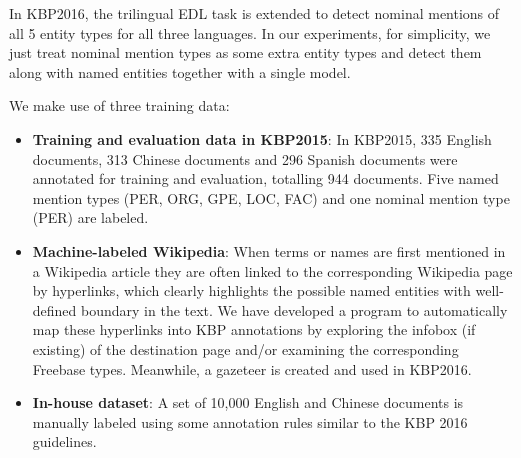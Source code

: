 \documentclass[11pt,a4paper]{article}
\begin{document}
In KBP2016, the trilingual EDL task is extended to detect nominal mentions of all 5 entity types for all three languages. In our experiments, for simplicity, we just treat nominal mention types as some extra entity types and detect them along with named entities together with a single model.  



We make use of three training data:

\begin{itemize}
	\item \textbf{Training and evaluation data in KBP2015}: In KBP2015, 335 English documents, 313 Chinese documents and 296 Spanish documents were annotated for training and evaluation, totalling 944 documents. Five named mention types (PER, ORG, GPE, LOC, FAC) and one nominal mention type (PER) are labeled. 
	
	\item \textbf{Machine-labeled Wikipedia}: When terms or names are first mentioned in a Wikipedia article they are often linked to the corresponding Wikipedia page by hyperlinks, which clearly highlights the possible named entities with well-defined boundary in the text. We have developed a program to automatically map these hyperlinks into KBP annotations by exploring the infobox (if existing) of the destination page and/or examining the corresponding Freebase types. Meanwhile, a gazeteer is created and used in KBP2016.
	
	\item \textbf{In-house dataset}: A set of 10,000 English and Chinese documents is manually labeled using some annotation rules similar to the KBP 2016 guidelines.
	
\end{itemize}
\end{document}
